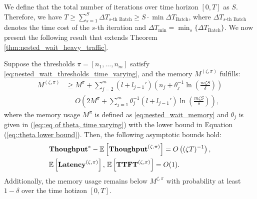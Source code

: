  We define that the total number of iterations over time horizon $[0,T]$ as $ S$. Therefore, we have $T\ge\sum_{s=1}^S \Delta T_{s\text{-th Batch}}\geq S\cdot \min \Delta T_{\text{Batch}}$, where $ \Delta T_{s\text{-th Batch}}$ denotes the time cost of the $s$-th iteration and $\Delta T_{\min}=\min_s\{\Delta T_{\text{Batch}}\}$.
We now present the following result that extends Theorem \ref{thm:nested_wait_heavy_traffic}.

\begin{theorem}
\label{thm:nested_wait_heavy_traffic_time_varying}
Suppose the thresholds $\pi = [n_1, \dots, n_m]$ satisfy \eqref{eq:nested_wait_thresholds_time_varying}, and the memory $M^{(\zeta,\pi)}$ fulfills:
\[
\begin{aligned}
M^{(\zeta,\pi)}
&\geq M^{\pi} + \sum_{j=2}^m (l + l_{j-1}') \left(n_j + \theta_j^{-1} \ln\!\left( \tfrac{m \zeta S}{\delta} \right)\right) \\
&= O\!\left( 2M^\pi + \sum_{j=1}^m \theta_j^{-1}  (l + l_{j-1}') \ln\!\left( \tfrac{m \zeta S}{\delta} \right) \right),
\end{aligned}
\]
where the memory usage $M^\pi$ is defined as \eqref{eq:nested_wait_memory} and $\theta_j$ is given in (\ref{eq::eq of theta, time varying}) with the lower bound in Equation (\ref{eq::theta lower bound}). Then, the following asymptotic bounds hold:
$$
    \begin{aligned}
        &\textbf{Thoughput}^* - \mathbb{E}\left[ \textbf{Thoughput}^{(\zeta, \pi)} \right] 
   = O\left( (\zeta T)^{-1} \right), \\
&\mathbb{E}\left[ \textbf{Latency}^{(\zeta, \pi)} \right], \,\mathbb{E}\left[ \textbf{TTFT}^{(\zeta, \pi)} \right] = O(1).
    \end{aligned}
$$
Additionally, the memory usage remains below $M^{\zeta,\pi}$ with probability at least $1 - \delta$ over the time hotizon $[0,T].$
\end{theorem}

